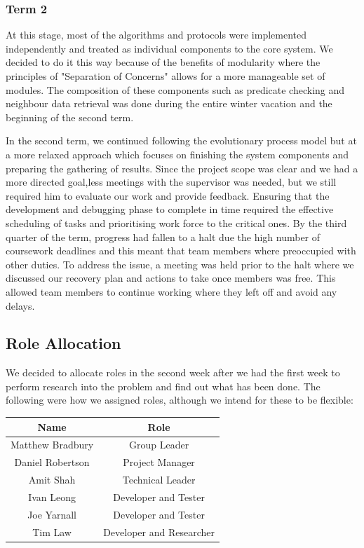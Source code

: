 \subsubsection*{Term 2}

At this stage, most of the algorithms and protocols were implemented independently and treated as individual components to the core system. We decided to do it this way because of the benefits of modularity where the principles of "Separation of Concerns" allows for a more manageable set of modules. The composition of these components such as predicate checking and neighbour data retrieval was done during the entire winter vacation and the beginning of the second term.

In the second term, we continued following the evolutionary process model but at a more relaxed approach which focuses on finishing the system components and preparing the gathering of results. Since the project scope was clear and we had a more directed goal,less meetings with the supervisor was needed, but we still required him to evaluate our work and provide feedback. Ensuring that the development and debugging phase to complete in time required the effective scheduling of tasks and prioritising work force to the critical ones. By the third quarter of the term, progress had fallen to a halt due the high number of coursework deadlines and this meant that team members where preoccupied with other duties. To address the issue, a meeting was held prior to the halt where we discussed our recovery plan and actions to take once members was free. This allowed team members to continue working where they left off and avoid any delays.

\subsection{Role Allocation}

We decided to allocate roles in the second week after we had the first week to perform research into the problem and find out what has been done. The following were how we assigned roles, although we intend for these to be flexible:

\begin{table}[H]
\centering
	\begin{tabular}{| c | c |}
		\hline
		Name & Role\\
		\hline
		Matthew Bradbury & Group Leader\\
		Daniel Robertson & Project Manager\\
		Amit Shah & Technical Leader\\
		Ivan Leong & Developer and Tester\\
		Joe Yarnall & Developer and Tester\\
		Tim Law & Developer and Researcher\\
		\hline
	\end{tabular}
\end{table}

